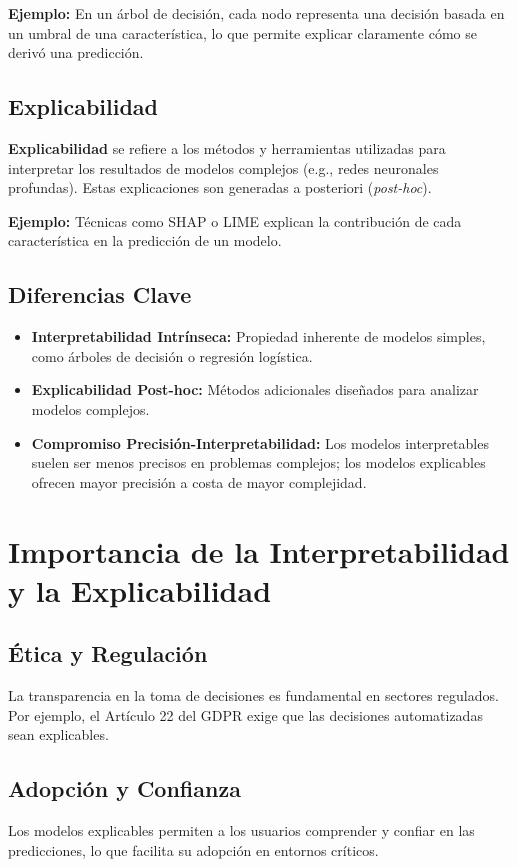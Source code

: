 \begin{refsection}
\textbf{Ejemplo:} En un árbol de decisión, cada nodo representa una decisión basada en un umbral de una característica, lo que permite explicar claramente cómo se derivó una predicción.

\subsection{Explicabilidad}
\textbf{Explicabilidad} se refiere a los métodos y herramientas utilizadas para interpretar los resultados de modelos complejos (e.g., redes neuronales profundas). Estas explicaciones son generadas a posteriori (\textit{post-hoc}).

\textbf{Ejemplo:} Técnicas como SHAP o LIME explican la contribución de cada característica en la predicción de un modelo.

\subsection{Diferencias Clave}
\begin{itemize}
    \item \textbf{Interpretabilidad Intrínseca:} Propiedad inherente de modelos simples, como árboles de decisión o regresión logística.
    \item \textbf{Explicabilidad Post-hoc:} Métodos adicionales diseñados para analizar modelos complejos.
    \item \textbf{Compromiso Precisión-Interpretabilidad:} Los modelos interpretables suelen ser menos precisos en problemas complejos; los modelos explicables ofrecen mayor precisión a costa de mayor complejidad.
\end{itemize}

\section{Importancia de la Interpretabilidad y la Explicabilidad}
\subsection{Ética y Regulación}
La transparencia en la toma de decisiones es fundamental en sectores regulados. Por ejemplo, el Artículo 22 del GDPR exige que las decisiones automatizadas sean explicables.

\subsection{Adopción y Confianza}
Los modelos explicables permiten a los usuarios comprender y confiar en las predicciones, lo que facilita su adopción en entornos críticos.


\end{refsection}

